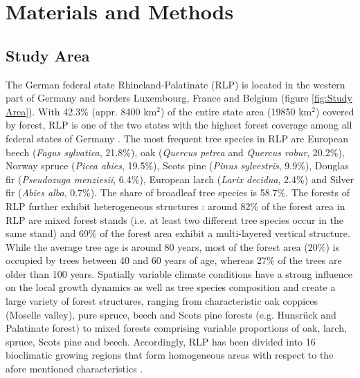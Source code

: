 \section{Materials and Methods}
\label{sec:MatMeth}

\subsection{Study Area}
\label{sec:studyarea}

The German federal state Rhineland-Palatinate (RLP) is located in the western part of Germany and borders Luxembourg, France and Belgium (figure \ref{fig:Study Area}). With 42.3\% (appr. 8400 km$^2$) of the entire state area (19850 km$^2$) covered by forest, RLP is one of the two states with the highest forest coverage among all federal states of Germany \citep{bwi3}.  The most frequent tree species in RLP are European beech (\textit{Fagus sylvatica}, 21.8\%), oak (\textit{Quercus petrea} and \textit{Quercus robur}, 20.2\%), Norway spruce (\textit{Picea abies}, 19.5\%), Scots pine (\textit{Pinus sylvestris}, 9.9\%), Douglas fir (\textit{Pseudozuga menziesii}, 6.4\%), European larch (\textit{Larix decidua}, 2.4\%) and Silver fir (\textit{Abies alba}, 0.7\%). The share of broadleaf tree species is 58.7\%. The forests of RLP further exhibit heterogeneous structures \citep{bwi3}: around 82\% of the forest area in RLP are mixed forest stands (i.e. at least two different tree species occur in the same stand) and 69\% of the forest area exhibit a multi-layered vertical structure. While the average tree age is around 80 years, most of the forest area (20\%) is occupied by trees between 40 and 60 years of age, whereas 27\% of the trees are older than 100 years. Spatially variable climate conditions have a strong influence on the local growth dynamics as well as tree species composition and create a large variety of forest structures, ranging from characteristic oak coppices (Moselle valley), pure spruce, beech and Scots pine forests (e.g. Hunsr{\"u}ck and Palatinate forest) to mixed forests comprising variable proportions of oak, larch, spruce, Scots pine and beech. Accordingly, RLP has been divided into 16 bioclimatic growing regions that form homogeneous areas with respect to the afore mentioned characteristics \citep{gauer2005}.

